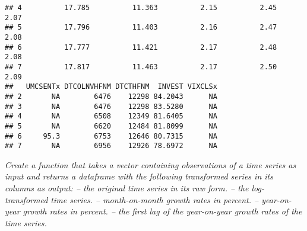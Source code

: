 \documentclass[
]{article}
\newenvironment{Shaded}{\begin{snugshade}}{\end{snugshade}}
\newcommand{\AttributeTok}[1]{\textcolor[rgb]{0.77,0.63,0.00}{#1}}
\newcommand{\ControlFlowTok}[1]{\textcolor[rgb]{0.13,0.29,0.53}{\textbf{#1}}}
\newcommand{\DecValTok}[1]{\textcolor[rgb]{0.00,0.00,0.81}{#1}}
\newcommand{\FunctionTok}[1]{\textcolor[rgb]{0.00,0.00,0.00}{#1}}
\newcommand{\NormalTok}[1]{#1}
\newcommand{\OtherTok}[1]{\textcolor[rgb]{0.56,0.35,0.01}{#1}}
\newcommand{\SpecialCharTok}[1]{\textcolor[rgb]{0.00,0.00,0.00}{#1}}
\begin{document}
\begin{verbatim}
## 4          17.785          11.363          2.15          2.45          2.07
## 5          17.796          11.403          2.16          2.47          2.08
## 6          17.777          11.421          2.17          2.48          2.08
## 7          17.817          11.463          2.17          2.50          2.09
##   UMCSENTx DTCOLNVHFNM DTCTHFNM  INVEST VIXCLSx
## 2       NA        6476    12298 84.2043      NA
## 3       NA        6476    12298 83.5280      NA
## 4       NA        6508    12349 81.6405      NA
## 5       NA        6620    12484 81.8099      NA
## 6     95.3        6753    12646 80.7315      NA
## 7       NA        6956    12926 78.6972      NA
\end{verbatim}

\textit{Create a function that takes a vector containing observations of a time series as input and returns a dataframe with the following transformed series in its columns as output:
– the original time series in its raw form.
– the log-transformed time series.
– month-on-month growth rates in percent.
– year-on-year growth rates in percent.
– the first lag of the year-on-year growth rates of the time series.}

\begin{Shaded}
\end{Shaded}
\end{document}
